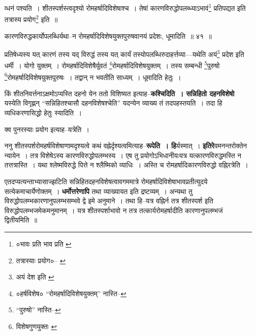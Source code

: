 \documentclass[article,12pt,a4paper]{memoir}
\begin{document}
	  \pstart व्धनं पश्यति । शीतस्पर्शस्त्वदृश्यो रोमहर्षादिविशेषाश्च । तेषां कारणविरुद्धोपलब्ध्याऽभावं\footnote{०भावः प्रति \cite{dp-edP} \cite{dp-edH} \cite{dp-edE} \cite{dp-edN} भाव प्रति \cite{dp-msA}} प्रतिपद्यत इति तत्रास्य प्रयोग\footnote{तत्रास्याः प्रयोग०--\cite{dp-msA} \cite{dp-msB} \cite{dp-msC} \cite{dp-msD} \cite{dp-edP} \cite{dp-edH} \cite{dp-edE} \cite{dp-edN}} इति ॥
	\pend
       
	  \bigskip
	  \begingroup
	

	  \pstart कारणविरुद्धकार्योपलब्धिर्यथा--न रोमहर्षादिविशेषयुक्तपुरुषवानयं प्रदेशः, धूमादिति ॥ ४१ ॥
	\pend
      
	  \endgroup
	 

	  \pstart प्रतिषेध्यस्य यत् कारणं तस्य यद् विरुद्धं तस्य यत् कार्यं तस्योपलब्धिरुदाहर्त्तव्या—यथेति अयं\footnote{अयं देश इति \cite{dp-msA} \cite{dp-edP} \cite{dp-edH} \cite{dp-edE} \cite{dp-edN}} प्रदेश इति धर्मी । योगो युक्तम् । रोमहर्षादिविशेषैर्युवतं \footnote{०हर्षविशेष० \cite{dp-msC} “रोमहर्षादिविशेषयुक्तम्” नास्ति--\cite{dp-msB}}रोमहर्षादिविशेषयुक्तम् । तस्य सम्बन्धी \footnote{“पुरुषो” नास्ति--\cite{dp-msC}}पुरुषो \footnote{विशेषगुणयुक्तः \cite{dp-msB}}रोमहर्षादिविशेषयुक्तपुरुषः । तद्वान् न भवतीति साध्यम् । धूमादिति हेतुः ।
	\pend
      
	  \endgroup
	

	  \pstart किं \leavevmode{} शीतनिवर्त्तनाऽक्षमोऽप्यस्ति दहनो येन ततो विशिष्यत इत्याह--\textbf{कश्चिदिति । सन्निहितो दहनविशेषो} यस्येति विगृह्णन् “सन्निहितश्चासौ दहनविशेषश्चेति” यदन्येन व्याख्य तं तदपहस्तयति । तदा हि व्यधिकरणासिद्धो हेतुः स्यादिति ।
	\pend
      

	  \pstart क्व पुनरस्याः प्रयोग इत्याह--यत्रेति ।
	\pend
      

	  \pstart ननु शीतस्पर्शरोमहर्षविशेषाणामदृश्यत्वे कथं वह्नेर्दृश्यत्वमित्याह--\textbf{रूपेति । हि}र्यस्मात् । \textbf{इतिरे}वमनन्तरोक्तेन न्यायेन । तत्र विशेषेऽस्य कारणविरुद्धोपलम्भस्य । एष तु प्रयोगोऽभिधानीयःयत्र यत्कारणविरुद्धमस्ति न तत्तत्रास्ति । यथा श्लेष्मविरुद्धे पित्ते न श्लैष्मिको व्याधिः । अस्ति च रोमहर्षादिकारणविरुद्धो वह्निरत्रेति ।
	\pend
      

	  \pstart एतदप्यत्यन्ताभ्यासाज्झटिति सन्निहितदहनविशेषत्वावगममात्रे रोमहर्षादिविशेषाभावप्रतीत्युदये सत्येकमाचार्येणोक्तम् । \textbf{धर्मोत्तरेणापि} तथा व्याख्यायत इति द्रष्टव्यम् । अन्यथा तु विरुद्धोपलम्भकारणानुपलम्भसम्भवे द्वे इमे अनुमाने । तथा हि--यत्र वह्निर्न तत्र शीतस्पर्श इति विरुद्धोपलम्भजमेकमनुमानम् । यत्र शीतस्पर्शाभावो न तत्र तत्कार्यरोमहर्षादीति कारणानुपलम्भजं द्वितीयमिति ॥
	\pend
      
\end{document}
